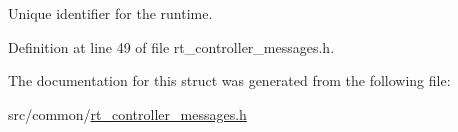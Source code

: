 Unique identifier for the runtime. 



Definition at line 49 of file rt\-\_\-controller\-\_\-messages.\-h.



The documentation for this struct was generated from the following file\-:\begin{DoxyCompactItemize}
\item 
src/common/\hyperlink{rt__controller__messages_8h}{rt\-\_\-controller\-\_\-messages.\-h}\end{DoxyCompactItemize}
